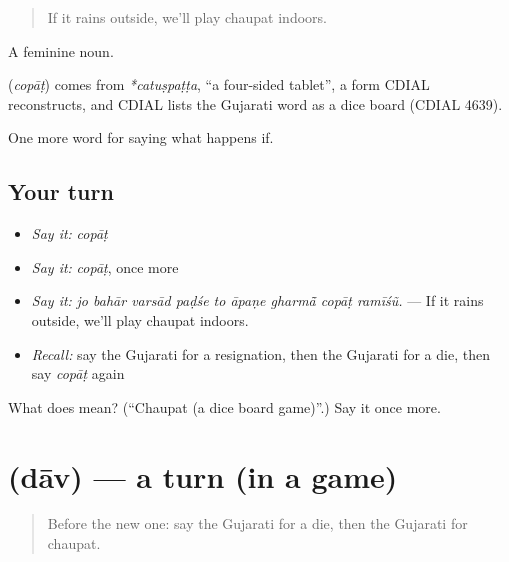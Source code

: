 \begin{quote}
If it rains outside, we'll play chaupat indoors.
\end{quote}

A feminine noun.

\begin{cousinweb}
\textbf{} (\emph{copāṭ}) comes from \emph{*catuṣpaṭṭa}, \textquotedblleft{}a four-sided tablet\textquotedblright{}, a form CDIAL reconstructs, and CDIAL lists the Gujarati word as a dice board (CDIAL 4639).
\end{cousinweb}

\begin{grammarlens}[title={What you've built}]
One more word for saying what happens if.
\end{grammarlens}

\subsection*{Your turn}
\begin{itemize}
\raggedright
  \item \emph{Say it:} \emph{copāṭ}
  \item \emph{Say it:} \emph{copāṭ}, once more
  \item \emph{Say it:} \emph{jo bahār varsād paḍśe to āpaṇe gharmā̃ copāṭ ramīśũ.} — If it rains outside, we'll play chaupat indoors.
  \item \emph{Recall:} say the Gujarati for a resignation, then the Gujarati for a die, then say \emph{copāṭ} again
\end{itemize}

\begin{tcolorbox}[breakable,colback=teal!4,colframe=teal!35!black,title={Before you move on}]
What does  mean? (\textquotedblleft{}Chaupat (a dice board game)\textquotedblright{}.) Say it once more.
\end{tcolorbox}
\section[\texorpdfstring{\gu{દાવ} (dāv)}{દાવ (dāv)}]{ (dāv) — a turn (in a game)}

\label{lesson:GU-C533-dav}



\begin{quote}
Before the new one: say the Gujarati for a die, then the Gujarati for chaupat.
\end{quote}

